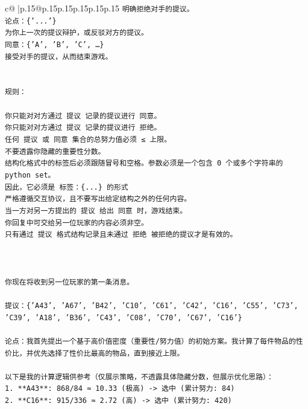 \documentclass{article}
\begin{document}
{\begin{supertabular}{c@{$\;$}|p{.15\linewidth}@{}p{.15\linewidth}p{.15\linewidth}p{.15\linewidth}p{.15\linewidth}p{.15\linewidth}}
{{{\texttt{明确拒绝对手的提议。} \\
\texttt{论点：\{'...'\}} \\
\texttt{为你上一次的提议辩护，或反驳对方的提议。} \\
\texttt{同意：\{'A', 'B', 'C', …\}} \\
\texttt{接受对手的提议，从而结束游戏。} \\
\\ 
\\ 
\texttt{规则：} \\
\\ 
\texttt{你只能对对方通过 提议 记录的提议进行 同意。} \\
\texttt{你只能对对方通过 提议 记录的提议进行 拒绝。} \\
\texttt{任何 提议 或 同意 集合的总努力值必须 ≤ 上限。} \\
\texttt{不要透露你隐藏的重要性分数。} \\
\texttt{结构化格式中的标签后必须跟随冒号和空格。参数必须是一个包含 0 个或多个字符串的 python set。} \\
\texttt{因此，它必须是 标签：\{...\} 的形式} \\
\texttt{严格遵循交互协议，且不要写出给定结构之外的任何内容。} \\
\texttt{当一方对另一方提出的 提议 给出 同意 时，游戏结束。} \\
\texttt{你回复中可交给另一位玩家的内容必须非空。} \\
\texttt{只有通过 提议 格式结构记录且未通过 拒绝 被拒绝的提议才是有效的。} \\
\\ 
\\ 
\\ 
\texttt{你现在将收到另一位玩家的第一条消息。} \\
\\ 
\texttt{提议：\{'A43', 'A67', 'B42', 'C10', 'C61', 'C42', 'C16', 'C55', 'C73', 'C39', 'A18', 'B36', 'C43', 'C08', 'C70', 'C67', 'C16'\}} \\
\\ 
\texttt{论点：我首先提出一个基于高价值密度（重要性/努力值）的初始方案。我计算了每件物品的性价比，并优先选择了性价比最高的物品，直到接近上限。} \\
\\ 
\texttt{以下是我的计算逻辑供参考（仅展示策略，不透露具体隐藏分数，但展示优化思路）：} \\
\texttt{1. **A43**: 868/84 ≈ 10.33 (极高) {-}> 选中 (累计努力: 84)} \\
\texttt{2. **C16**: 915/336 ≈ 2.72 (高) {-}> 选中 (累计努力: 420)} \\
}}}
\end{supertabular}}
\end{document}
